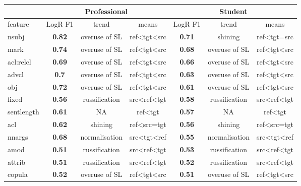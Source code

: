 \begin{longtable}[H]{p{1.6cm}|ccc||ccc}
	\toprule
		      &      \multicolumn{3}{c}{Professional} 	&      \multicolumn{3}{c}{Student}\\
	\midrule
	feature & LogR F1 & trend & means   & LogR F1 & trend   & means   \\
	\midrule
	nsubj   & \textbf{0.82} & overuse of SL  & ref\textless{}tgt\textless{}src & \textbf{0.71} & shining & ref\textless{}tgt=src  \\
	mark & \textbf{0.74} & overuse of SL  & ref\textless{}tgt\textless{}src & \textbf{0.68} & overuse of SL & ref\textless{}tgt\textless{}src \\
	acl:relcl  & \textbf{0.69} & overuse of SL  & ref\textless{}tgt\textless{}src & \textbf{0.66} & overuse of SL & ref\textless{}tgt\textless{}src \\
	advcl   & \textbf{0.7}  & overuse of SL  & ref\textless{}tgt\textless{}src & \textbf{0.63} & overuse of SL & ref\textless{}tgt\textless{}src \\
	obj  & \textbf{0.72} & overuse of SL  & ref\textless{}tgt\textless{}src & \textbf{0.61} & overuse of SL & ref\textless{}tgt\textless{}src \\
	fixed   & \textbf{0.56} & russification  & src\textless{}ref\textless{}tgt & \textbf{0.58} & russification & src\textless{}ref\textless{}tgt \\
	sentlength & \textbf{0.61} & NA  & ref\textless{}tgt & \textbf{0.57} & NA & ref\textless{}tgt \\
	acl  & \textbf{0.62} & shining  & ref\textless{}src=tgt  & \textbf{0.56} & shining & ref\textless{}src=tgt  \\
	nnargs  & \textbf{0.68} & normalisation  & src\textless{}tgt\textless{}ref & \textbf{0.55} & normalisation & src\textless{}tgt\textless{}ref \\
	amod & \textbf{0.51} & russification  & src\textless{}ref\textless{}tgt & \textbf{0.53} & russification & src\textless{}ref\textless{}tgt \\
	attrib  & \textbf{0.51} & russification  & src\textless{}ref\textless{}tgt & \textbf{0.52} & russification & src\textless{}ref\textless{}tgt \\
	copula  & \textbf{0.52} & overuse of SL  & ref\textless{}tgt\textless{}src & \textbf{0.51} & overuse of SL & ref\textless{}tgt\textless{}src \\

\end{longtable}
